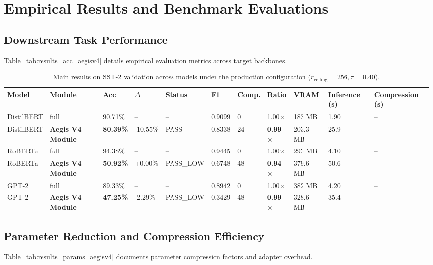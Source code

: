 \section{Empirical Results and Benchmark Evaluations}

\subsection{Downstream Task Performance}
Table~\ref{tab:results_acc_aegisv4} details empirical evaluation metrics across target backbones.

\begin{table}[t]
\centering
\small
\begin{tabular}{lllllllllll}
\toprule
\textbf{Model} & \textbf{Module} & \textbf{Acc} & \textbf{$\Delta$} & \textbf{Status} & \textbf{F1} & \textbf{Comp.} & \textbf{Ratio} & \textbf{VRAM} & \textbf{Inference (s)} & \textbf{Compression (s)} \\
\midrule
DistilBERT & full & 90.71\% & -- & -- & 0.9099 & 0 & 1.00$\times$ & 183 MB & 1.90 & -- \\
DistilBERT & \textbf{Aegis V4 Module} & \textbf{80.39\%} & -10.55\% & PASS & 0.8338 & 24 & \textbf{0.99$\times$} & 203.3 MB & 25.9 & -- \\
RoBERTa & full & 94.38\% & -- & -- & 0.9445 & 0 & 1.00$\times$ & 293 MB & 4.10 & -- \\
RoBERTa & \textbf{Aegis V4 Module} & \textbf{50.92\%} & +0.00\% & PASS\_LOW & 0.6748 & 48 & \textbf{0.94$\times$} & 379.6 MB & 50.6 & -- \\
GPT-2 & full & 89.33\% & -- & -- & 0.8942 & 0 & 1.00$\times$ & 382 MB & 4.20 & -- \\
GPT-2 & \textbf{Aegis V4 Module} & \textbf{47.25\%} & -2.29\% & PASS\_LOW & 0.3429 & 48 & \textbf{0.99$\times$} & 328.6 MB & 35.4 & -- \\
\bottomrule
\end{tabular}
\caption{Main results on SST-2 validation across models under the production configuration ($r_{\mathrm{ceiling}}=256, \tau=0.40$).}
\label{tab:main_sst2}
\end{table}

\subsection{Parameter Reduction and Compression Efficiency}
Table~\ref{tab:results_params_aegisv4} documents parameter compression factors and adapter overhead.

